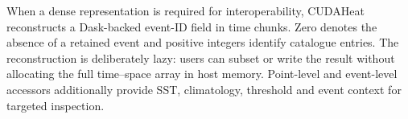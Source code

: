 When a dense representation is required for interoperability, CUDAHeat reconstructs a Dask-backed event-ID field in time chunks. Zero denotes the absence of a retained event and positive integers identify catalogue entries. The reconstruction is deliberately lazy: users can subset or write the result without allocating the full time--space array in host memory. Point-level and event-level accessors additionally provide SST, climatology, threshold and event context for targeted inspection.
